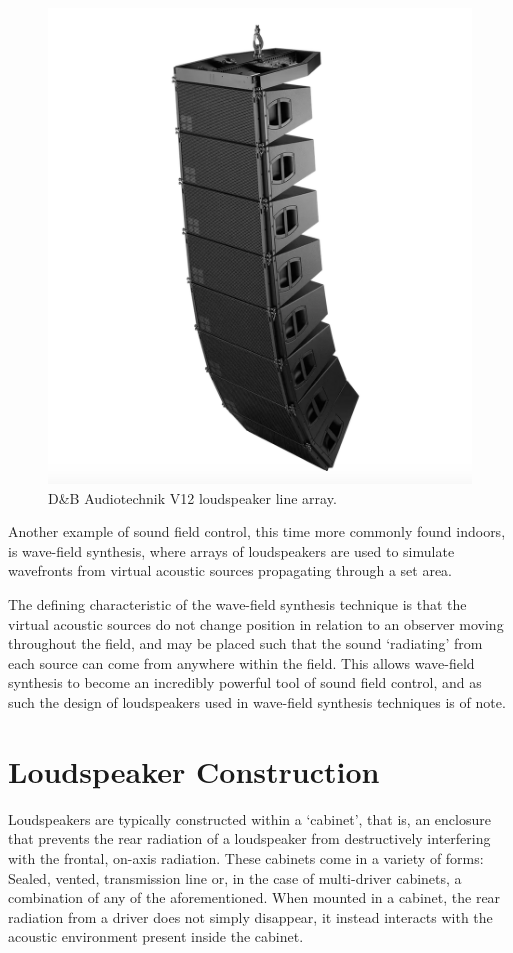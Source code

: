 \documentclass{report}
\begin{document}
        \begin{figure}[H]
            \centering
            \includegraphics[width = 0.4\linewidth]{figs/dbAudiotechnik.png}
            \caption{D\&B Audiotechnik V12 loudspeaker line array.}
            \label{dbAudiotechnik}
        \end{figure}

        Another example of sound field control, this time more commonly found indoors, is wave-field synthesis, where arrays of loudspeakers are used to simulate wavefronts from virtual acoustic sources propagating through a set area.

        The defining characteristic of the wave-field synthesis technique is that the virtual acoustic sources do not change position in relation to an observer moving throughout the field, and may be placed such that the sound `radiating' from each source can come from anywhere within the field.
        This allows wave-field synthesis to become an incredibly powerful tool of sound field control, and as such the design of loudspeakers used in wave-field synthesis techniques is of note.
    \section{Loudspeaker Construction}
        Loudspeakers are typically constructed within a `cabinet', that is, an enclosure that prevents the rear radiation of a loudspeaker from destructively interfering with the frontal, on-axis radiation.
        These cabinets come in a variety of forms: Sealed, vented, transmission line or, in the case of multi-driver cabinets, a combination of any of the aforementioned.
        When mounted in a cabinet, the rear radiation from a driver does not simply disappear, it instead interacts with the acoustic environment present inside the cabinet.
\end{document}
